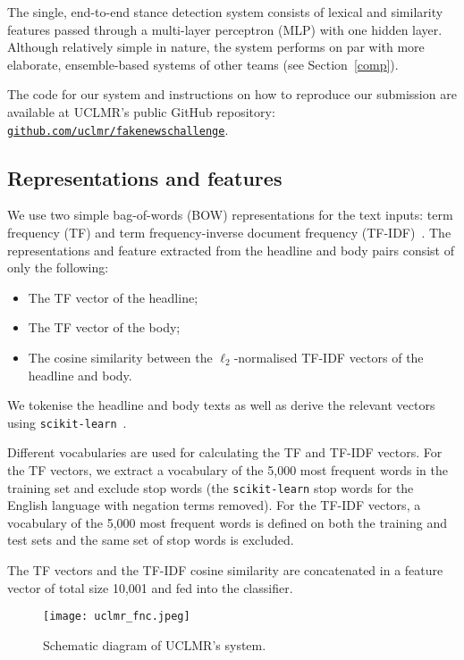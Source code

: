 \documentclass{article}
\begin{document}
The single, end-to-end stance detection system consists of lexical and similarity features passed through a multi-layer perceptron (MLP) with one hidden layer.
Although relatively simple in nature, the system performs on par with more elaborate, ensemble-based systems of other teams \cite{talos, athene} (see Section~\ref{comp}).

The code for our system and instructions on how to reproduce our submission are available at UCLMR's public GitHub repository: \hyperlink{http://www.github.com/uclmr/fakenewschallenge}{\texttt{github.com/uclmr/fakenewschallenge}}.

\subsection{Representations and features}

We use two simple bag-of-words (BOW) representations for the text inputs: term frequency (TF) and term frequency-inverse document frequency (TF-IDF)~\cite{tf, tfidf}.
The representations and feature extracted from the headline and body pairs consist of only the following:

\begin{itemize}
  \item The TF vector of the headline;
  \item The TF vector of the body;
  \item The cosine similarity between the $\ell_{2}$-normalised TF-IDF vectors of the headline and body.
\end{itemize}

We tokenise the headline and body texts as well as derive the relevant vectors using \texttt{scikit-learn}~\cite{scikit}.

Different vocabularies are used for calculating the TF and TF-IDF vectors. For the TF vectors, we extract a vocabulary of the 5,000 most frequent words in the training set and exclude stop words (the \texttt{scikit-learn} stop words for the English language with negation terms removed). For the TF-IDF vectors, a vocabulary of the 5,000 most frequent words is defined on both the training and test sets and the same set of stop words is excluded.

The TF vectors and the TF-IDF cosine similarity are concatenated in a feature vector of total size 10,001 and fed into the classifier.

\bigskip
\begin{figure}[h]
  \centering
  \texttt{[image: uclmr\_fnc.jpeg]}
  \caption{Schematic diagram of UCLMR's system.}
  \label{fig: model}
\end{figure}
\bigskip
\end{document}

